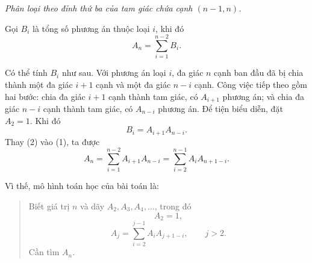 \documentclass[11pt]{article}
\begin{document}
\newpage
\begin{center}

\smallskip
\textit{Phân loại theo đỉnh thứ ba của tam giác chứa cạnh \((n-1,n)\).}
\end{center}

Gọi \(B_i\) là tổng số phương án thuộc loại \(i\), khi đó
\[
  A_n=\sum_{i=1}^{n-2} B_i. \tag{1}
\]

Có thể tính \(B_i\) như sau. Với phương án loại \(i\), đa giác \(n\) cạnh ban
đầu đã bị chia thành một đa giác \(i+1\) cạnh và một đa giác \(n-i\) cạnh.
Công việc tiếp theo gồm hai bước: chia đa giác \(i+1\) cạnh thành tam giác,
có \(A_{i+1}\) phương án; và chia đa giác \(n-i\) cạnh thành tam giác, có
\(A_{n-i}\) phương án. Để tiện biểu diễn, đặt \(A_2=1\). Khi đó
\[
  B_i=A_{i+1}A_{n-i}. \tag{2}
\]
Thay (2) vào (1), ta được
\[
  A_n
  =\sum_{i=1}^{n-2} A_{i+1}A_{n-i}
  =\sum_{i=2}^{n-1} A_iA_{n+1-i}. \tag{3}
\]

Vì thế, mô hình toán học của bài toán là:
\begin{quote}
Biết giá trị \(n\) và dãy \(A_2,A_3,A_4,\ldots\), trong đó
\[
  A_2=1,
\]
\[
  A_j=\sum_{i=2}^{j-1} A_iA_{j+1-i},\qquad j>2.
\]
Cần tìm \(A_n\).
\end{quote}
\end{document}
